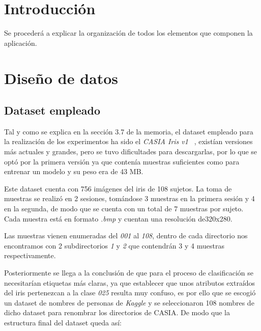 
\section{Introducción}
Se procederá a explicar la organización de todos los elementos que componen la aplicación.
\section{Diseño de datos}
\subsection{Dataset empleado}
Tal y como se explica en la sección 3.7 de la memoria, el dataset empleado para la realización de los experimentos ha sido el \emph{CASIA Iris v1} ~\cite{casia:1}, existían versiones más actuales y grandes, pero se tuvo dificultades para descargarlas, por lo que se optó por la primera versión ya que contenía muestras suficientes como para entrenar un modelo y su peso era de 43 MB.

Este dataset cuenta con 756 imágenes del iris de 108 sujetos. La toma
de muestras se realizó en 2 sesiones, tomándose 3 muestras en la primera sesión y 4 en la segunda, de modo que se cuenta con un total de 7 muestras por sujeto. Cada muestra está en formato \emph{.bmp} y cuentan una resolución de320x280.

Las muestras vienen enumeradas del \emph{001} al \emph{108}, dentro de cada directorio nos encontramos con 2 subdirectorios \emph{1} y \emph{2} que contendrán 3 y 4 muestras respectivamente.

Posteriormente se llega a la conclusión de que para el proceso de clasificación se necesitarían etiquetas más claras, ya que establecer que unos atributos extraídos del iris pertenezcan a la clase \emph{025} resulta muy confuso, es por ello que se escogió un dataset de nombres de personas de \emph{Kaggle} y se seleccionaron 108 nombres de dicho dataset para renombrar los directorios de CASIA. De modo que la estructura final del dataset queda así:

